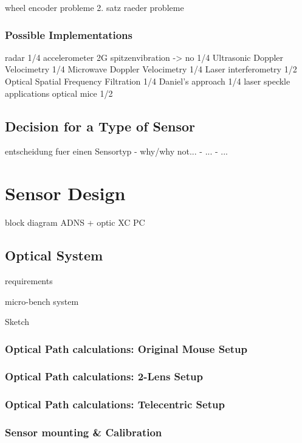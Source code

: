 \documentclass[12pt,a4paper]{article}
\begin{document}
      wheel encoder
        probleme
      2. satz raeder
        probleme

\subsubsection{Possible Implementations}

      radar
1/4
      accelerometer
        2G spitzenvibration -> no
1/4
      Ultrasonic Doppler Velocimetry
1/4
      Microwave Doppler Velocimetry
1/4
      Laser interferometry
1/2
      Optical Spatial Frequency Filtration
1/4
        Daniel's approach
1/4
        laser speckle applications
        optical mice
1/2


\subsection{Decision for a Type of Sensor}
  entscheidung fuer einen Sensortyp
    - why/why not...
    - ...
    - ...


\section{Sensor Design}

block diagram
  ADNS + optic
  XC
  PC

\subsection{Optical System}
  requirements

micro-bench system

Sketch

\subsubsection{Optical Path calculations: Original Mouse Setup}

\subsubsection{Optical Path calculations: 2-Lens Setup}

\subsubsection{Optical Path calculations: Telecentric Setup}


\subsubsection{Sensor mounting \& Calibration}
\end{document}
